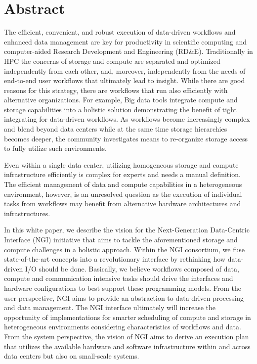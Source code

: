 \documentclass[a4paper, twocolumn]{article}
\title{\papertitle}
\author{Julian M. Kunkel
  \textit{University of Reading}
	\and
  Chris Hoffman
  \textit{National Center for Atmospheric Research}
  \and
  Andy Poling
  \textit{Kove}
  \and
  Jay Lofstead \textit{Sandia National Laboratories}
}
\date{\today}
\begin{document}
\maketitle
\thispagestyle{fancy}

\section*{Abstract}
The efficient, convenient, and robust execution of data-driven workflows and enhanced data management are key for productivity in scientific computing and computer-aided Research Development and Engineering (RD\&E).
Traditionally in HPC the concerns of storage and compute are separated and optimized independently from each other, and, moreover, independently from the needs of end-to-end user workflows that ultimately lead to insight.
While there are good reasons for this strategy, there are workflows that run also efficiently with alternative organizations.
For example, Big data tools integrate compute and storage capabilities into a holistic solution demonstrating the benefit of tight integrating for data-driven workflows.
As workflows become increasingly complex and blend beyond data centers while at the same time storage hierarchies becomes deeper, the community investigates means to re-organize storage access to fully utilize such environments.


Even within a single data center, utilizing homogeneous storage and compute infrastructure efficiently is complex for experts and needs a manual definition.
The efficient management of data and compute capabilities in a heterogeneous environment, however, is an unresolved question as the execution of individual tasks from workflows may benefit from alternative hardware architectures and infrastructures.

In this white paper, we describe the vision for the Next-Generation Data-Centric Interface (NGI) initiative that aims to tackle the aforementioned storage and compute challenges in a holistic approach.
Within the NGI consortium, we fuse state-of-the-art concepts into a revolutionary interface by rethinking how data-driven I/O should be done.
Basically, we believe workflows composed of data, compute and communication intensive tasks should drive the interfaces and hardware configurations to best support these programming models.
From the user perspective, NGI aims to provide an abstraction to data-driven processing and data management.
The NGI interface ultimately will increase the opportunity of implementations for smarter scheduling of compute and storage in heterogeneous environments considering characteristics of workflows and data.
From the system perspective, the vision of NGI aims to derive an execution plan that utilizes the available hardware and software infrastructure within and across data centers but also on small-scale systems.
\end{document}
